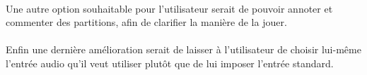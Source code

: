 \paragraph{}
Une autre option souhaitable pour l'utilisateur serait de pouvoir annoter et commenter des partitions, afin de clarifier la manière de la jouer.

\paragraph{}
Enfin une dernière amélioration serait de laisser à l'utilisateur de choisir lui-même l'entrée audio qu'il veut utiliser plutôt que de lui imposer l'entrée standard.
